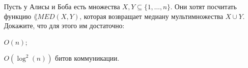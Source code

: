Пусть у Алисы и Боба есть множества $X, Y \subseteq \{1, \dots, n\}$. Они хотят посчитать функцию $\lang{MED}(X, Y)$, которая
возвращает медиану мультимножества $X \cup Y$. Докажите, что для этого им достаточно:
\begin{enumcyr}
    \item $O(n)$;
    \item $O(\log^2(n))$ битов коммуникации.
\end{enumcyr}